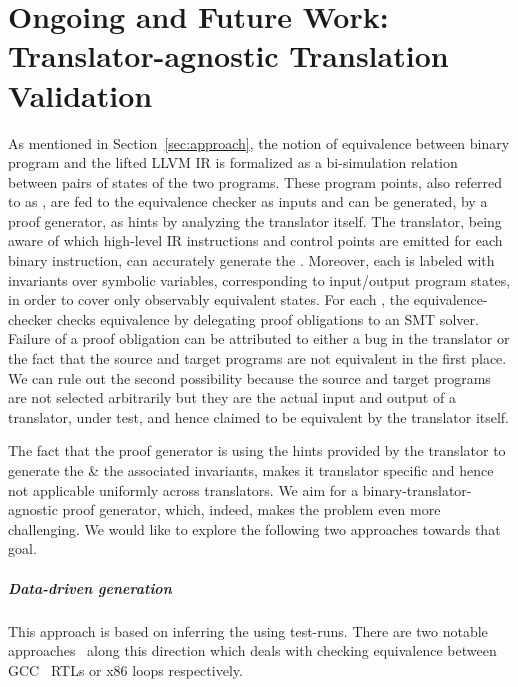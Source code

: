 \chapter{Ongoing and Future Work: Translator-agnostic Translation
  Validation}\label{sec:future} As mentioned in Section~\ref{sec:approach},
  the notion of equivalence between  binary program and the lifted LLVM IR is
  formalized as a bi-simulation relation~\cite{Sangiorgi:2011} between pairs of
  states of the two programs. These program points, also referred to as
  \syncps, are fed to the equivalence checker as inputs and can
  be generated, by a proof generator,  as hints by analyzing the translator
  itself. The translator, being aware of which high-level IR instructions and
  control points are emitted for each binary instruction, can accurately
  generate the \syncps. Moreover, each \syncp is
  labeled with invariants over symbolic variables, corresponding to
  input/output program states, in order to cover only observably equivalent
  states. For each \syncp, the equivalence-checker checks
  equivalence by delegating proof obligations to an SMT solver. Failure of a proof
  obligation can be attributed to either a bug in the translator or  the fact
  that the source and target programs are not equivalent in the first place. We
  can rule out the second possibility because the source and target programs
  are not selected arbitrarily but they are the actual input and output of a
  translator, under test, and hence claimed to be equivalent by the translator
  itself.
 
The fact that the proof generator is using the hints provided by the translator
to  generate the \syncps \& the associated  invariants,  makes it  translator specific and hence not applicable
uniformly across translators. We aim for a  binary-translator-agnostic proof
generator, which, indeed, makes the problem  even more challenging. We would
like to explore the following two approaches towards that goal.

\paragraph{\textbf{Data-driven \syncp generation}} This approach
is based on inferring the \syncps using test-runs. There are two
notable approaches~\cite{Iman2005,DDEC:OOPSLA:2013} along this direction which
deals with checking equivalence between GCC~\cite{GCC} RTLs or x86 loops respectively.

